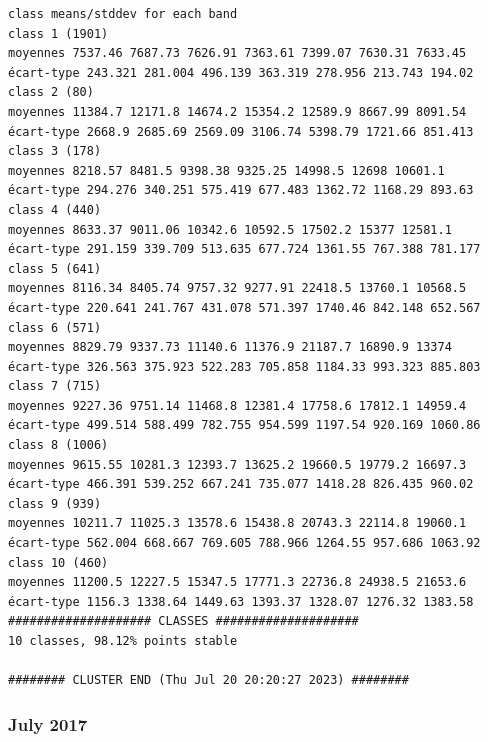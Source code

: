 \documentclass[environments,article,submit,pdftex,moreauthors]{Definitions/mdpi}
\begin{document}
\begin{scriptsize}
\begin{verbatim}
class means/stddev for each band
class 1 (1901)
moyennes 7537.46 7687.73 7626.91 7363.61 7399.07 7630.31 7633.45
écart-type 243.321 281.004 496.139 363.319 278.956 213.743 194.02
class 2 (80)
moyennes 11384.7 12171.8 14674.2 15354.2 12589.9 8667.99 8091.54
écart-type 2668.9 2685.69 2569.09 3106.74 5398.79 1721.66 851.413
class 3 (178)
moyennes 8218.57 8481.5 9398.38 9325.25 14998.5 12698 10601.1
écart-type 294.276 340.251 575.419 677.483 1362.72 1168.29 893.63
class 4 (440)
moyennes 8633.37 9011.06 10342.6 10592.5 17502.2 15377 12581.1
écart-type 291.159 339.709 513.635 677.724 1361.55 767.388 781.177
class 5 (641)
moyennes 8116.34 8405.74 9757.32 9277.91 22418.5 13760.1 10568.5
écart-type 220.641 241.767 431.078 571.397 1740.46 842.148 652.567
class 6 (571)
moyennes 8829.79 9337.73 11140.6 11376.9 21187.7 16890.9 13374
écart-type 326.563 375.923 522.283 705.858 1184.33 993.323 885.803
class 7 (715)
moyennes 9227.36 9751.14 11468.8 12381.4 17758.6 17812.1 14959.4
écart-type 499.514 588.499 782.755 954.599 1197.54 920.169 1060.86
class 8 (1006)
moyennes 9615.55 10281.3 12393.7 13625.2 19660.5 19779.2 16697.3
écart-type 466.391 539.252 667.241 735.077 1418.28 826.435 960.02
class 9 (939)
moyennes 10211.7 11025.3 13578.6 15438.8 20743.3 22114.8 19060.1
écart-type 562.004 668.667 769.605 788.966 1264.55 957.686 1063.92
class 10 (460)
moyennes 11200.5 12227.5 15347.5 17771.3 22736.8 24938.5 21653.6
écart-type 1156.3 1338.64 1449.63 1393.37 1328.07 1276.32 1383.58
#################### CLASSES ####################
10 classes, 98.12% points stable

######## CLUSTER END (Thu Jul 20 20:20:27 2023) ########
\end{verbatim}
\end{scriptsize}

\subsubsection[\appendixname~\thesubsubsection]{July 2017}
\end{document}

